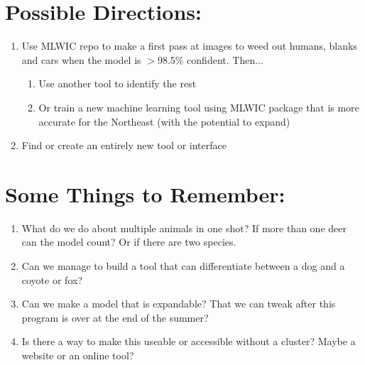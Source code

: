 \documentclass[11pt,a4paper]{article}\usepackage[]{graphicx}\usepackage[]{color}
\begin{document}
\section*{Possible Directions:}
\begin{enumerate}
\item Use MLWIC repo to make a first pass at images to weed out humans, blanks and cars when the model is $>$98.5\% confident. Then...
  \begin{enumerate}
  \item Use another tool to identify the rest
  \item Or train a new machine learning tool using MLWIC package that is more accurate for the Northeast (with the potential to expand)
  \end{enumerate}
\item Find or create an entirely new tool or interface
\end{enumerate}

\section*{Some Things to Remember:}
\begin{enumerate}
\item What do we do about multiple animals in one shot? If more than one deer can the model count? Or if there are two species. 
\item Can we manage to build a tool that can differentiate between a dog and a coyote or fox?
\item Can we make a model that is expandable? That we can tweak after this program is over at the end of the summer?
\item Is there a way to make this useable or accessible without a cluster? Maybe a website or an online tool?
\end{enumerate}
\end{document}

